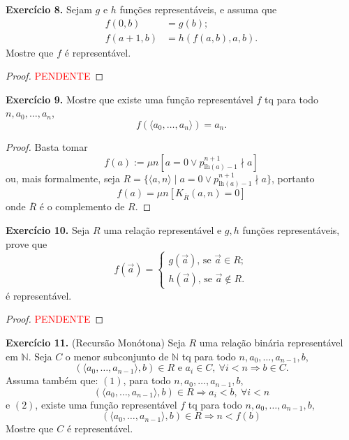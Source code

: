 \documentclass[11pt]{article}
\newcommand{\mbb}[1]{\mathbb{#1}}
\begin{document}
\begin{shaded}
\textbf{Exercício 8.} Sejam $g$ e $h$ funções representáveis, e assuma que
\begin{align*}
    f(0,b) & = g(b);\\
    f(a+1,b) & = h(f(a,b),a,b).
\end{align*}
Mostre que $f$ é representável.
\end{shaded}

\begin{proof}
    \textcolor{red}{PENDENTE}
\end{proof}

\begin{shaded}
\textbf{Exercício 9.} Mostre que existe uma função representável $f$ tq para todo $n,a_0,\dots,a_n$,
$$f(\langle a_0,\dots,a_n\rangle)=a_n.$$
\end{shaded}

\begin{proof}
    Basta tomar
    $$f(a):=\mu n\left[a=0\vee p_{\text{lh}(a)-1}^{n+1}\nmid a\right]$$
    ou, mais formalmente, seja $R=\{\langle a,n\rangle\mid a=0\vee p^{n+1}_{\text{lh}(a)-1}\nmid a\}$, portanto
    $$f(a)=\mu n\left[K_{\overline{R}}(a,n)=0\right]$$
    onde $\overline{R}$ é o complemento de $R$.
\end{proof}

\begin{shaded}
\textbf{Exercício 10.} Seja $R$ uma relação representável e $g,h$ funções representáveis, prove que
$$f(\vec{a})=
\begin{cases}
g(\vec{a})\text{, se }\vec{a}\in R;\\
h(\vec{a})\text{, se }\vec{a}\notin R.
\end{cases}$$
é representável.
\end{shaded}

\begin{proof}
    \textcolor{red}{PENDENTE}
\end{proof}

\begin{shaded}
\textbf{Exercício 11.} (Recursão Monótona) Seja $R$ uma relação binária representável em $\mbb{N}$. Seja $C$ o menor subconjunto de $\mbb{N}$ tq para todo $n,a_0,\dots,a_{n-1},b$,
$$(\langle a_0,\dots,a_{n-1}\rangle,b)\in R\text{ e }a_i\in C,~\forall i<n\Rightarrow b\in C.$$
Assuma também que: $(1)$, para todo $n,a_0,\dots,a_{n-1},b$,
$$(\langle a_0,\dots,a_{n-1}\rangle,b)\in R\Rightarrow a_i<b,~\forall i<n$$
e $(2)$, existe uma função representável $f$ tq para todo $n,a_0,\dots,a_{n-1},b$,
$$(\langle a_0,\dots,a_{n-1}\rangle,b)\in R\Rightarrow n<f(b)$$
Mostre que $C$ é representável.
\end{shaded}
\end{document}
